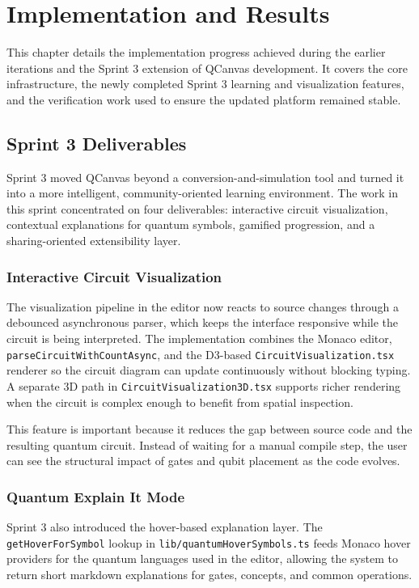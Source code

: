 \chapter{Implementation and Results}

This chapter details the implementation progress achieved during the earlier iterations and the Sprint 3 extension of QCanvas development. It covers the core infrastructure, the newly completed Sprint 3 learning and visualization features, and the verification work used to ensure the updated platform remained stable.

\section{Sprint 3 Deliverables}

Sprint 3 moved QCanvas beyond a conversion-and-simulation tool and turned it into a more intelligent, community-oriented learning environment. The work in this sprint concentrated on four deliverables: interactive circuit visualization, contextual explanations for quantum symbols, gamified progression, and a sharing-oriented extensibility layer.

\subsection{Interactive Circuit Visualization}

The visualization pipeline in the editor now reacts to source changes through a debounced asynchronous parser, which keeps the interface responsive while the circuit is being interpreted. The implementation combines the Monaco editor, \texttt{parseCircuitWithCountAsync}, and the D3-based \texttt{CircuitVisualization.tsx} renderer so the circuit diagram can update continuously without blocking typing. A separate 3D path in \texttt{CircuitVisualization3D.tsx} supports richer rendering when the circuit is complex enough to benefit from spatial inspection.

This feature is important because it reduces the gap between source code and the resulting quantum circuit. Instead of waiting for a manual compile step, the user can see the structural impact of gates and qubit placement as the code evolves.

\subsection{Quantum Explain It Mode}

Sprint 3 also introduced the hover-based explanation layer. The \texttt{getHoverForSymbol} lookup in \texttt{lib/quantumHoverSymbols.ts} feeds Monaco hover providers for the quantum languages used in the editor, allowing the system to return short markdown explanations for gates, concepts, and common operations.

